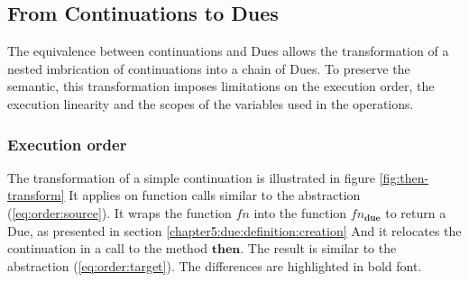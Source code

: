 \subsection{From Continuations to Dues} \label{chapter5:due:equivalence}

The equivalence between continuations and Dues allows the transformation of a nested imbrication of continuations into a chain of Dues.
To preserve the semantic, this transformation imposes limitations on the execution order, the execution linearity and the scopes of the variables used in the operations.

\subsubsection{Execution order}

The transformation of a simple continuation is illustrated in figure \ref{fig:then-transform}
It applies on function calls similar to the abstraction (\ref{eq:order:source}).
It wraps the function $fn$ into the function $fn_\textbf{due}$ to return a Due, as presented in section \ref{chapter5:due:definition:creation}
And it relocates the continuation in a call to the method $\textbf{then}$.
The result is similar to the abstraction (\ref{eq:order:target}).
The differences are highlighted in bold font.


